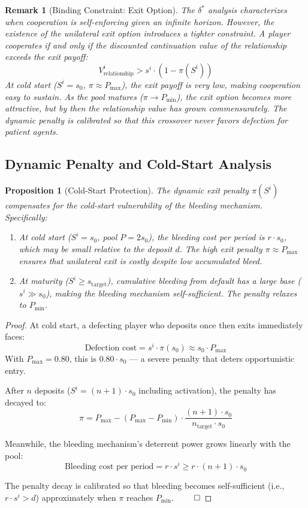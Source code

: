 \documentclass[12pt]{article}
\newtheorem{proposition}{Proposition}
\newtheorem{remark}{Remark}
\begin{document}
\begin{remark}[Binding Constraint: Exit Option]
\label{rem:binding-constraint}
The $\delta^*$ analysis characterizes when cooperation is self-enforcing given an infinite horizon. However, the existence of the unilateral exit option introduces a tighter constraint. A player cooperates if and only if the discounted continuation value of the relationship exceeds the exit payoff:
\[
V_{\text{relationship}}^i > s^i \cdot (1 - \pi(S^i))
\]
At cold start ($S^i = s_0$, $\pi \approx P_{\max}$), the exit payoff is very low, making cooperation easy to sustain. As the pool matures ($\pi \to P_{\min}$), the exit option becomes more attractive, but by then the relationship value has grown commensurately. The dynamic penalty is calibrated so that this crossover never favors defection for patient agents.
\end{remark}

\subsection{Dynamic Penalty and Cold-Start Analysis}
\label{sec:dynamic-penalty-analysis}

\begin{proposition}[Cold-Start Protection]
\label{prop:cold-start}
The dynamic exit penalty $\pi(S^i)$ compensates for the cold-start vulnerability of the bleeding mechanism. Specifically:
\begin{enumerate}
    \item At cold start ($S^i = s_0$, pool $P = 2s_0$), the bleeding cost per period is $r \cdot s_0$, which may be small relative to the deposit $d$. The high exit penalty $\pi \approx P_{\max}$ ensures that unilateral exit is costly despite low accumulated bleed.
    \item At maturity ($S^i \geq s_{\text{target}}$), cumulative bleeding from default has a large base ($s^i \gg s_0$), making the bleeding mechanism self-sufficient. The penalty relaxes to $P_{\min}$.
\end{enumerate}
\end{proposition}

\begin{proof}
At cold start, a defecting player who deposits once then exits immediately faces:
\[
\text{Defection cost} = s^i \cdot \pi(s_0) \approx s_0 \cdot P_{\max}
\]
With $P_{\max} = 0.80$, this is $0.80 \cdot s_0$ --- a severe penalty that deters opportunistic entry.

After $n$ deposits ($S^i = (n+1) \cdot s_0$ including activation), the penalty has decayed to:
\[
\pi = P_{\max} - (P_{\max} - P_{\min}) \cdot \frac{(n+1) \cdot s_0}{n_{\text{target}} \cdot s_0}
\]

Meanwhile, the bleeding mechanism's deterrent power grows linearly with the pool:
\[
\text{Bleeding cost per period} = r \cdot s^i \geq r \cdot (n+1) \cdot s_0
\]

The penalty decay is calibrated so that bleeding becomes self-sufficient (i.e., $r \cdot s^i > d$) approximately when $\pi$ reaches $P_{\min}$. $\qed$
\end{proof}
\end{document}
